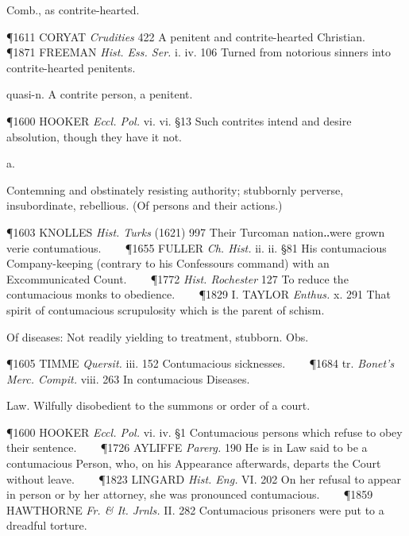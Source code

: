 \begin{description}[wide, labelwidth=!, labelindent=0pt]
\begin{myenumerate}
 Comb., as contrite-hearted.

\P 1611 CORYAT  \textit{Crudities} 422 A penitent and contrite-hearted Christian.    
\P 1871 FREEMAN  \textit{Hist. Ess. Ser.} i. iv. 106 Turned from notorious sinners into contrite-hearted penitents.

 quasi-n. A contrite person, a penitent.

\P 1600 HOOKER  \textit{Eccl. Pol.} vi. vi. §13 Such contrites intend and desire absolution, though they have it not.
\end{myenumerate}


 a.

\noindent {}


\vspace{-0.3cm}

\begin{myenumerate}

 Contemning and obstinately resisting authority; stubbornly perverse, insubordinate, rebellious. (Of persons and their actions.)

\P 1603 KNOLLES  \textit{Hist. Turks} (1621) 997 Their Turcoman nation‥were grown verie contumatious.    
\P 1655 FULLER  \textit{Ch. Hist.} ii. ii. §81 His contumacious Company-keeping (contrary to his Confessours command) with an Excommunicated Count.    
\P 1772 \textit{Hist.  Rochester} 127 To reduce the contumacious monks to obedience.    
\P 1829 I. TAYLOR  \textit{Enthus.} x. 291 That spirit of contumacious scrupulosity which is the parent of schism.

 Of diseases: Not readily yielding to treatment, stubborn. Obs.

\P 1605 TIMME  \textit{Quersit.} iii. 152 Contumacious sicknesses.    
\P 1684 tr.  \textit{Bonet's Merc. Compit.} viii. 263 In contumacious Diseases.

 Law. Wilfully disobedient to the summons or order of a court.

\P 1600 HOOKER  \textit{Eccl. Pol.} vi. iv. §1 Contumacious persons which refuse to obey their sentence.    
\P 1726 AYLIFFE  \textit{Parerg.} 190 He is in Law said to be a contumacious Person, who, on his Appearance afterwards, departs the Court without leave.    
\P 1823 LINGARD  \textit{Hist. Eng.} VI. 202 On her refusal to appear in person or by her attorney, she was pronounced contumacious.    
\P 1859 HAWTHORNE  \textit{Fr. \& It. Jrnls.} II. 282 Contumacious prisoners were put to a dreadful torture.


\end{myenumerate}
\end{description}
